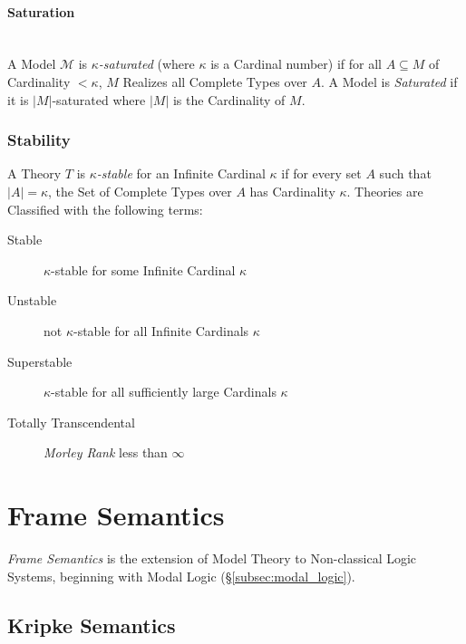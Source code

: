 \documentclass{article}
\begin{document}
\paragraph{Saturation}\label{subsec:model_saturation}\hfill
\\

A Model $\mathcal{M}$ is \emph{$\kappa$-saturated} (where $\kappa$ is
a Cardinal number) if for all $A \subseteq M$ of Cardinality $<
\kappa$, $M$ Realizes all Complete Types over $A$. A Model is
\emph{Saturated} if it is $|M|$-saturated where $|M|$ is the
Cardinality of $M$.

\subsubsection{Stability}\label{subsec:model_stability}

A Theory $T$ is \emph{$\kappa$-stable} for an Infinite Cardinal $\kappa$
if for every set $A$ such that $|A| = \kappa$, the Set of Complete
Types over $A$ has Cardinality $\kappa$. Theories are Classified with
the following terms:
\begin{description}
\item [Stable] $\kappa$-stable for some Infinite Cardinal $\kappa$
\item [Unstable] not $\kappa$-stable for all Infinite Cardinals $\kappa$
\item [Superstable] $\kappa$-stable for all sufficiently large
  Cardinals $\kappa$
\item [Totally Transcendental] \emph{Morley Rank}\cite{morley65} less
  than $\infty$
\end{description}



\section{Frame Semantics}\label{sec:frame_semantics}

\emph{Frame Semantics} is the extension of Model Theory to
Non-classical Logic Systems, beginning with Modal Logic
(\S\ref{subsec:modal_logic}).

\subsection{Kripke Semantics}\label{subsec:kripke_semantics}
\end{document}
